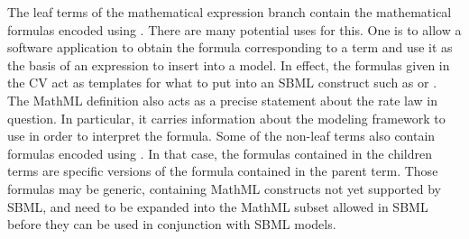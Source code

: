 The leaf terms of the mathematical expression branch contain the
mathematical formulas encoded using \mathmltwo.  There are many
potential uses for this.  One is to allow a software application
to obtain the formula corresponding to a term and use it as the
basis of an expression to insert into a model.  In effect, the
formulas given in the CV act as templates for what to put into an
SBML construct such as \KineticLaw or \Rule.  The MathML
definition also acts as a precise statement about the rate law in
question. In particular, it carries information about the modeling
framework to use in order to interpret the formula.  Some of the
non-leaf terms also contain formulas encoded using \mathmltwo. In
that case, the formulas contained in the children terms are
specific versions of the formula contained in the parent term.
Those formulas may be generic, containing MathML constructs not
yet supported by SBML, and need to be expanded into the MathML
subset allowed in SBML before they can be used in conjunction with
SBML models.

